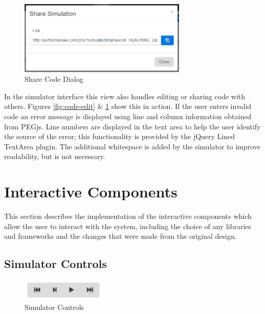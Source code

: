 \documentclass[bsc,twoside,singlespacing,parskip,logo,notimes,normalheadings]{infthesis}
\begin{document}
        \begin{figure}[!ht]
          \centering
          \includegraphics[width=8cm]{img/code-share.png}
          \caption{Share Code Dialog}\label{fig:code-share}
        \end{figure}

        In the simulator interface this view also handles editing or
        sharing code with others. Figures \ref{fig:code-edit} \&
        \ref{fig:code-share} show this in action. If the user enters
        invalid code an error message is displayed using line and
        column information obtained from PEGjs. Line numbers are
        displayed in the text area to help the user identify the
        source of the error; this functionality is provided by the
        jQuery Lined TextArea\cite{jquerylinedtextarea} plugin. The
        additional whitespace is added by the simulator to improve
        readability, but is not necessary.
        

    \section{Interactive Components}
    This section describes the implementation of the interactive
    components which allow the user to interact with the system,
    including the choice of any libraries and frameworks and the
    changes that were made from the original design.

        \subsection{Simulator Controls}

        \begin{figure}[!ht]
          \centering
          \includegraphics[width=4cm, trim=0 0 0 0]{img/simcontrols.png}
          \captionsetup{width=4cm, justification=centering}
          \caption{Simulator Controls}\label{fig:simcontrols}
        \end{figure}
\end{document}

